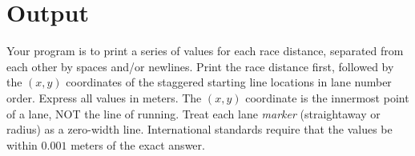 \section*{Output}

Your program is to print a series of values for each race distance, separated
from each other by spaces and/or newlines.
Print the race distance first, followed by the $(x, y)$ coordinates of the staggered starting line locations in lane number order.
Express all values in
meters.  The $(x, y)$ coordinate is the innermost point of a lane, NOT the line of running.
Treat each lane {\sl marker} (straightaway or radius) as a zero-width line.
International standards require that the values be within $0.001$ meters of
the exact answer.
